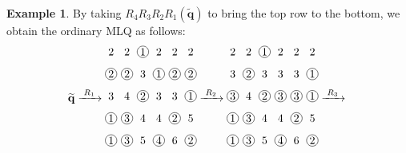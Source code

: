 \documentclass[submission]{FPSAC2018}
\newcommand{\qq}{\mathbf{q}}
\theoremstyle{plain}
\theoremstyle{definition}
\newtheorem{example}[thm]{Example}
\numberwithin{equation}{section}
\begin{document}
\begin{example}
By taking $R_4 R_3 R_2 R_1(\widetilde{\qq})$ to bring the top row to the bottom, we obtain the ordinary MLQ as follows:
\[
\widetilde{\qq} \xrightarrow[\hspace{15pt}]{R_1}
\begin{tikzpicture}[xscale=0.5,yscale=0.7,every node/.style={inner sep=0.8pt},baseline=55]
\node at (0, 5){2};\node at (1, 5){2};\node[circle, draw=black] at (2, 5){1};\node at (3, 5){2};\node at (4, 5){2};\node at (5, 5){2};\node[circle, draw=black] at (0, 4){2};\node[circle, draw=black] at (1, 4){2};\node at (2, 4){3};\node[circle, draw=black] at (3, 4){1};\node[circle, draw=black] at (4, 4){2};\node[circle, draw=black] at (5, 4){2};\node at (0, 3){3};\node at (1, 3){4};\node[circle, draw=black] at (2, 3){2};\node at (3, 3){3};\node at (4, 3){3};\node[circle, draw=black] at (5, 3){1};\node[circle, draw=black] at (0, 2){1};\node[circle, draw=black] at (1, 2){3};\node at (2, 2){4};\node at (3, 2){4};\node[circle, draw=black] at (4, 2){2};\node at (5, 2){5};\node[circle, draw=black] at (0, 1){1};\node[circle, draw=black] at (1, 1){3};\node at (2, 1){5};\node[circle, draw=black] at (3, 1){4};\node at (4, 1){6};\node[circle, draw=black] at (5, 1){2};
\end{tikzpicture}
\xrightarrow[\hspace{15pt}]{R_2}
\begin{tikzpicture}[xscale=0.5,yscale=0.7,every node/.style={inner sep=0.8pt},baseline=55]
\node at (0, 5){2};\node at (1, 5){2};\node[circle, draw=black] at (2, 5){1};\node at (3, 5){2};\node at (4, 5){2};\node at (5, 5){2};\node at (0, 4){3};\node[circle, draw=black] at (1, 4){2};\node at (2, 4){3};\node at (3, 4){3};\node at (4, 4){3};\node[circle, draw=black] at (5, 4){1};\node[circle, draw=black] at (0, 3){3};\node at (1, 3){4};\node[circle, draw=black] at (2, 3){2};\node[circle, draw=black] at (3, 3){3};\node[circle, draw=black] at (4, 3){3};\node[circle, draw=black] at (5, 3){1};\node[circle, draw=black] at (0, 2){1};\node[circle, draw=black] at (1, 2){3};\node at (2, 2){4};\node at (3, 2){4};\node[circle, draw=black] at (4, 2){2};\node at (5, 2){5};\node[circle, draw=black] at (0, 1){1};\node[circle, draw=black] at (1, 1){3};\node at (2, 1){5};\node[circle, draw=black] at (3, 1){4};\node at (4, 1){6};\node[circle, draw=black] at (5, 1){2};
\end{tikzpicture}
\xrightarrow[\hspace{15pt}]{R_3}
\begin{tikzpicture}[xscale=0.5,yscale=0.7,every node/.style={inner sep=0.8pt},baseline=55]

\end{tikzpicture}\]
\end{example}
\end{document}
